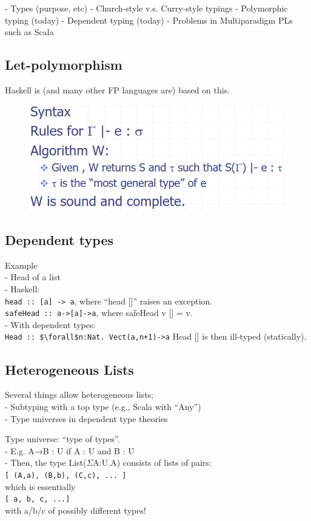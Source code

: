 \documentclass[tikz,border=10pt]{project_plan}
\begin{document}
- Types (purpose, etc)
- Church-style v.s. Curry-style typings
- Polymorphic typing (today)
- Dependent typing (today)
- Problems in Multiparadigm PLs such as Scala

\subsection{Let-polymorphism}

Haskell is (and many other FP languages are) based
on this.

\begin{figure}[H]
  \centering
  \includegraphics[width=.4\linewidth]{let poly.png}
\end{figure}

\subsection{Dependent types}

Example\\
- Head of a list\\
- Haskell:\\
\lstinline?head :: [a] -> a?, where “head []” raises an exception.\\
\lstinline?safeHead :: a->[a]->a?, where safeHead v [] = v.\\
- With dependent types:\\
\lstinline[mathescape]?Head :: $\forall$n:Nat. Vect(a,n+1)->a?
Head [] is then ill-typed (statically).

\subsection{Heterogeneous Lists}

Several things allow heterogeneous lists;\\
- Subtyping with a top type (e.g., Scala with “Any”)\\
- Type universes in dependent type theories

Type universe: “type of types”.\\
- E.g. A→B : U if A : U and B : U\\
- Then, the type List($\Sigma$A:U.A) consists of lists of pairs:\\
\lstinline?[ (A,a), (B,b), (C,c), ... ]?\\
which is essentially\\
\lstinline?[ a, b, c, ...]?\\
with a/b/c of possibly different types!
\end{document}
